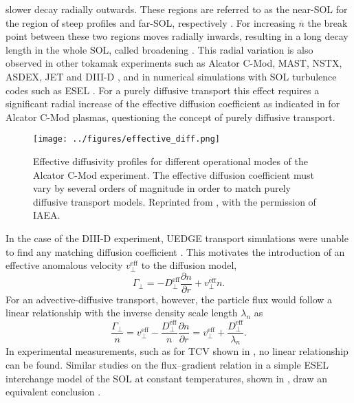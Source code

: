 slower decay radially outwards. These regions are referred to as the near-SOL for the
region of steep profiles and far-SOL, respectively \cite{labombard2001particle}. For
increasing $\overline{n}$ the break point between these two regions moves radially
inwards, resulting in a long decay length in the whole SOL, called broadening
\cite{militello2016scrape}. This radial variation is also observed in other tokamak
experiments such as Alcator C-Mod, MAST, NSTX, ASDEX, JET and DIII-D
\cite{umansky1999modeling,rudakov2005far,militello2013experimental,boedo2014edge,carralero2014experimental,stangeby2000plasma,lipschultz2005comparison},
and in numerical simulations with SOL turbulence codes such as ESEL
\cite{naulin2007turbulent}. For a purely diffusive transport this effect requires a
significant radial increase of the effective diffusion coefficient as indicated in
 for Alcator C-Mod plasmas, questioning the concept of purely
diffusive transport.
\begin{figure}[t]
  \centering
  \texttt{[image: ../figures/effective\_diff.png]}

  \caption{Effective diffusivity profiles for different operational modes of the Alcator
    C-Mod experiment. The effective diffusion coefficient must vary by several orders of
    magnitude in order to match purely diffusive transport models. Reprinted from
    \cite{labombard2000cross}, with the permission of IAEA.}

  \label{Fig:labombard}
\end{figure}
%
In the case of the DIII-D experiment, UEDGE transport simulations were unable to find
any matching diffusion coefficient \cite{pigarov2002tokamak}. This motivates the
introduction of an effective anomalous velocity $v_\perp^\textrm{eff}$ to the diffusion
model,
\begin{equation}
  \Gamma_\perp = - D_\perp^\textrm{eff} \frac{\partial n}{\partial r} + v_\perp^\textrm{eff} n.
\end{equation}
%
For an advective-diffusive transport, however, the particle flux would follow a linear
relationship with the inverse density scale length $\lambda_n$
\cite{garcia2007turbulent} as
\begin{equation}
  \frac{\Gamma_\perp}{n} =  v_\perp^\textrm{eff} - \frac{D_\perp^\textrm{eff}}{n} \frac{\partial n}{\partial r} = v_\perp^\textrm{eff} + \frac{D_\perp^\textrm{eff}}{\lambda_n}.
\end{equation}
%
In experimental measurements, such as for TCV shown in , no
linear relationship can be found. Similar studies on the ﬂux–gradient relation in a
simple ESEL interchange model of the SOL at constant temperatures, shown in
, draw an equivalent conclusion \cite{naulin2007turbulent}.

